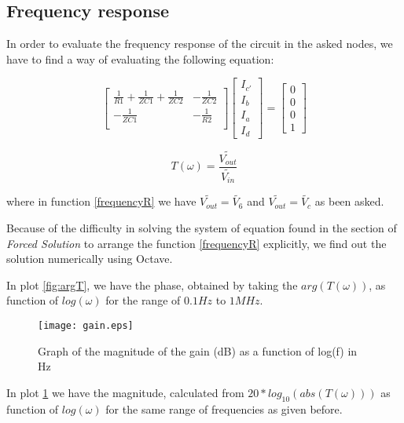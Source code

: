 \subsection{Frequency response}

In order to evaluate the frequency response of the circuit in the asked nodes, we have to find a way of evaluating the following equation:


\[
  \begin{bmatrix}
    \frac{1}{R1} + \frac{1}{ZC1} + \frac{1}{ZC2} & -\frac{1}{ZC2} \\
    -\frac{1}{ZC1}                               & -\frac{1}{R2}  \\
  \end{bmatrix}
  \begin{bmatrix}
    I_{c'} \\ I_b \\ I_a \\ I_d
  \end{bmatrix}
  =
  \begin{bmatrix}
    0 \\ 0 \\ 0 \\ 1
  \end{bmatrix}
\]

\hfill


\begin{equation}
  T(\omega) = \frac{\widetilde{V_{out}}}{\widetilde{V_{in}}}
  \label{frequencyR}
\end{equation}

where in function \ref{frequencyR} we have $\widetilde{V_{out}} = \tilde{V_6}$ and $\widetilde{V_{out}} = \tilde{V_c}$ as been asked.

Because of the difficulty in solving the system of equation found in the section of \textit{Forced Solution} to arrange the function \ref{frequencyR} explicitly, we find out the solution numerically using Octave.

In plot \ref{fig:argT}, we have the phase, obtained by taking the $arg(T(\omega))$, as function of $log(\omega)$ for the range of $0.1Hz$ to $1MHz$.

\begin{figure}[h] \centering
  \texttt{[image: gain.eps]}
  \caption{Graph of the magnitude of the gain (dB) as a function of log(f) in Hz}
  \label{fig:absT}
\end{figure}

In plot \ref{fig:absT} we have the magnitude, calculated from $20*log_{10}(abs(T(\omega)))$ as function of $log(\omega)$ for the same range of frequencies as given before.

